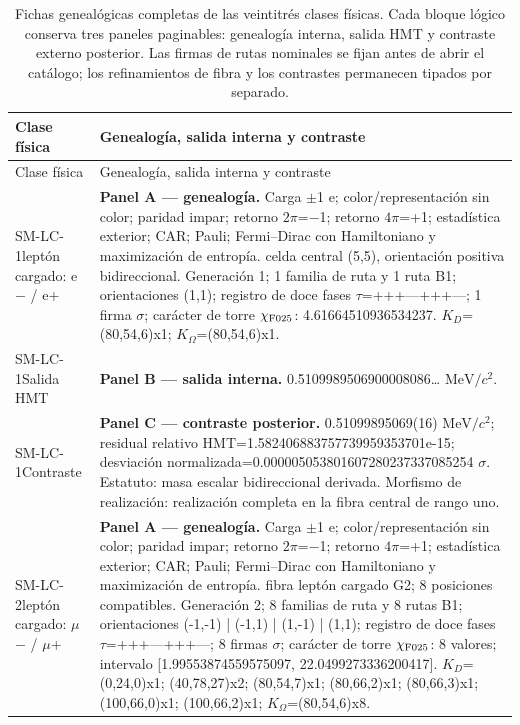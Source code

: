 \begingroup
\footnotesize
\setlength{\tabcolsep}{3.0pt}
\renewcommand{\arraystretch}{1.13}
\setlength{\LTpre}{0.35em}
\setlength{\LTpost}{0.35em}
\begin{longtable}{@{}>{\raggedright\arraybackslash}p{2.55cm}>{\raggedright\arraybackslash}p{11.75cm}@{}}
\caption{Fichas genealógicas completas de las veintitrés clases físicas. Cada bloque lógico conserva tres paneles paginables: genealogía interna, salida HMT y contraste externo posterior. Las firmas de rutas nominales se fijan antes de abrir el catálogo; los refinamientos de fibra y los contrastes permanecen tipados por separado.}
\label{tab:comparacion-completa-masas-hmt-acumulativa}\\
\toprule
Clase física & Genealogía, salida interna y contraste \\
\midrule
\endfirsthead
\toprule
Clase física & Genealogía, salida interna y contraste \\
\midrule
\endhead
\bottomrule
\endfoot
SM-LC-1\newline leptón cargado: e\(-\) / e+ & \textbf{Panel A --- genealogía. }Carga \(\pm\)1 e; color/representación sin color; paridad impar; retorno \(2\pi\)=\(-\)1; retorno \(4\pi\)=+1; estadística exterior; CAR; Pauli; Fermi--Dirac con Hamiltoniano y maximización de entropía. celda central (5,5), orientación positiva bidireccional. Generación 1; 1 familia de ruta y 1 ruta B1; orientaciones (1,1); registro de doce fases \(\tau\)=+++---+++---; 1 firma \(\sigma\); carácter de torre \(\chi_{\rm F025}\): 4.61664510936534237. \(K_D\)=(80,54,6)x1; \(K_{\Omega}\)=(80,54,6)x1. \\
SM-LC-1\newline Salida HMT & \textbf{Panel B --- salida interna. }0.5109989506900008086\ldots{} \(\mathrm{MeV}/c^2\). \\
SM-LC-1\newline Contraste & \textbf{Panel C --- contraste posterior. }0.51099895069(16) \(\mathrm{MeV}/c^2\); residual relativo HMT=1.582406883757739959353701e-15; desviación normalizada=0.000005053801607280237337085254 \(\sigma\). Estatuto: masa escalar bidireccional derivada. Morfismo de realización: realización completa en la fibra central de rango uno. \\\addlinespace[2pt]
SM-LC-2\newline leptón cargado: \(\mu\)\(-\) / \(\mu\)+ & \textbf{Panel A --- genealogía. }Carga \(\pm\)1 e; color/representación sin color; paridad impar; retorno \(2\pi\)=\(-\)1; retorno \(4\pi\)=+1; estadística exterior; CAR; Pauli; Fermi--Dirac con Hamiltoniano y maximización de entropía. fibra leptón cargado G2; 8 posiciones compatibles. Generación 2; 8 familias de ruta y 8 rutas B1; orientaciones (-1,-1) | (-1,1) | (1,-1) | (1,1); registro de doce fases \(\tau\)=+++---+++---; 8 firmas \(\sigma\); carácter de torre \(\chi_{\rm F025}\): 8 valores; intervalo [1.99553874559575097, 22.0499273336200417]. \(K_D\)=(0,24,0)x1; (40,78,27)x2; (80,54,7)x1; (80,66,2)x1; (80,66,3)x1; (100,66,0)x1; (100,66,2)x1; \(K_{\Omega}\)=(80,54,6)x8. \\

\end{longtable}
